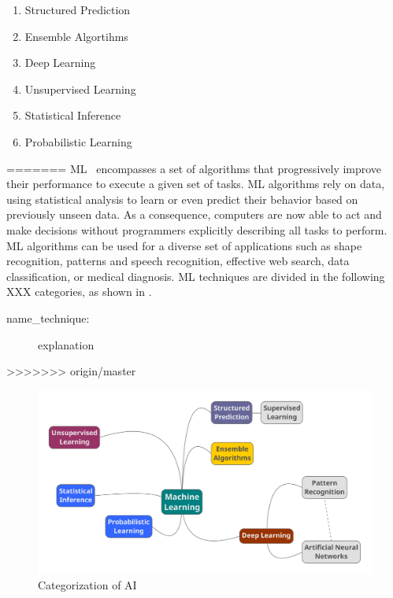 \begin{enumerate}
 \item Structured Prediction
 \item Ensemble Algortihms
 \item Deep Learning 
 \item Unsupervised Learning
 \item Statistical Inference 
 \item Probabilistic Learning
\end{enumerate}
=======
\ac{ML}~\cite{mitchell97} encompasses a set of algorithms that progressively improve their 
performance to execute a given set of tasks. \ac{ML} algorithms rely on data, using statistical 
analysis to learn or even predict their behavior based on previously unseen data. As a consequence, 
computers are now able to act and make decisions without programmers explicitly describing all 
tasks to perform. \ac{ML} algorithms can be used for a diverse set of applications such as shape 
recognition, patterns and speech recognition, effective web search, data classification, or medical 
diagnosis. \ac{ML} techniques are divided in the following XXX categories, as shown in 
.
\begin{description}
  \item[name\_technique:] explanation 
\end{description}
>>>>>>> origin/master

\begin{figure}[htbp]
  \centering
  \includegraphics[width=\textwidth]{images/ai-categorization}
  \caption{Categorization of \ac{AI}}
  \label{fig:ai-categorization}
\end{figure}

